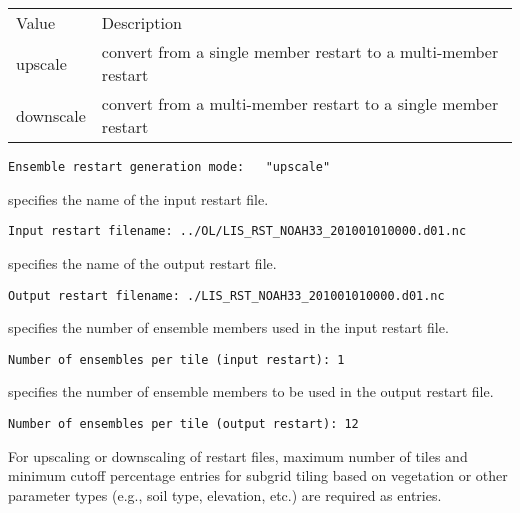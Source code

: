  \begin{tabular}{ll}
 Value     & Description                          \\
 upscale   & convert from a single member restart
             to a multi-member restart            \\
 downscale & convert from a multi-member restart
             to a single member restart           \\
 \end{tabular}
 

 \begin{Verbatim}[frame=single]
Ensemble restart generation mode:   "upscale"
 \end{Verbatim}

 
 specifies the name of the input restart file. 
 

 \begin{Verbatim}[frame=single]
Input restart filename: ../OL/LIS_RST_NOAH33_201001010000.d01.nc
 \end{Verbatim}

 
 specifies the name of the output restart file. 
 

 \begin{Verbatim}[frame=single]
Output restart filename: ./LIS_RST_NOAH33_201001010000.d01.nc
 \end{Verbatim}

 
 specifies the number of ensemble members used in the input restart
 file. 
 

 \begin{Verbatim}[frame=single]
Number of ensembles per tile (input restart): 1
 \end{Verbatim}

 
 specifies the number of ensemble members to be used in the output
 restart file. 
 

 \begin{Verbatim}[frame=single]
Number of ensembles per tile (output restart): 12
 \end{Verbatim}

 
 For upscaling or downscaling of restart files, maximum number of tiles and minimum 
 cutoff percentage entries for subgrid tiling based on vegetation or other 
 parameter types (e.g., soil type, elevation, etc.) are required as entries.

